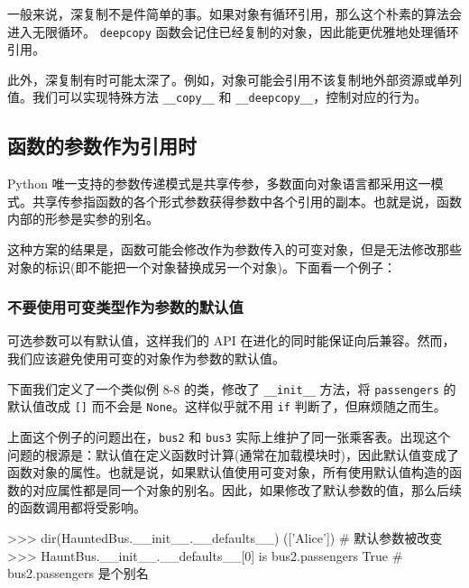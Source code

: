 

一般来说，深复制不是件简单的事。如果对象有循环引用，那么这个朴素的算法会进入无限循环。 \texttt{deepcopy} 函数会记住已经复制的对象，因此能更优雅地处理循环引用。



此外，深复制有时可能太深了。例如，对象可能会引用不该复制地外部资源或单列值。我们可以实现特殊方法 \texttt{\_\_copy\_\_} 和 \texttt{\_\_deepcopy\_\_}，控制对应的行为。

\subsection{函数的参数作为引用时}

Python 唯一支持的参数传递模式是共享传参，多数面向对象语言都采用这一模式。共享传参指函数的各个形式参数获得参数中各个引用的副本。也就是说，函数内部的形参是实参的别名。

这种方案的结果是，函数可能会修改作为参数传入的可变对象，但是无法修改那些对象的标识(即不能把一个对象替换成另一个对象)。下面看一个例子：



\subsubsection{不要使用可变类型作为参数的默认值}

可选参数可以有默认值，这样我们的 API 在进化的同时能保证向后兼容。然而，我们应该避免使用可变的对象作为参数的默认值。

下面我们定义了一个类似例 8-8 的类，修改了 \texttt{\_\_init\_\_} 方法，将 \texttt{passengers} 的默认值改成 \texttt{[]} 而不会是 \texttt{None}。这样似乎就不用 \texttt{if} 判断了，但麻烦随之而生。



上面这个例子的问题出在，\texttt{bus2} 和 \texttt{bus3} 实际上维护了同一张乘客表。出现这个问题的根源是：默认值在定义函数时计算(通常在加载模块时)，因此默认值变成了函数对象的属性。也就是说，如果默认值使用可变对象，所有使用默认值构造的函数的对应属性都是同一个对象的别名。因此，如果修改了默认参数的值，那么后续的函数调用都将受影响。

\begin{python}
>>> dir(HauntedBus.__init__.__defaults__)
(['Alice'])     # 默认参数被改变
>>> HauntBus.__init__.__defaults__[0] is bus2.passengers
True            # bus2.passengers 是个别名
\end{python}

